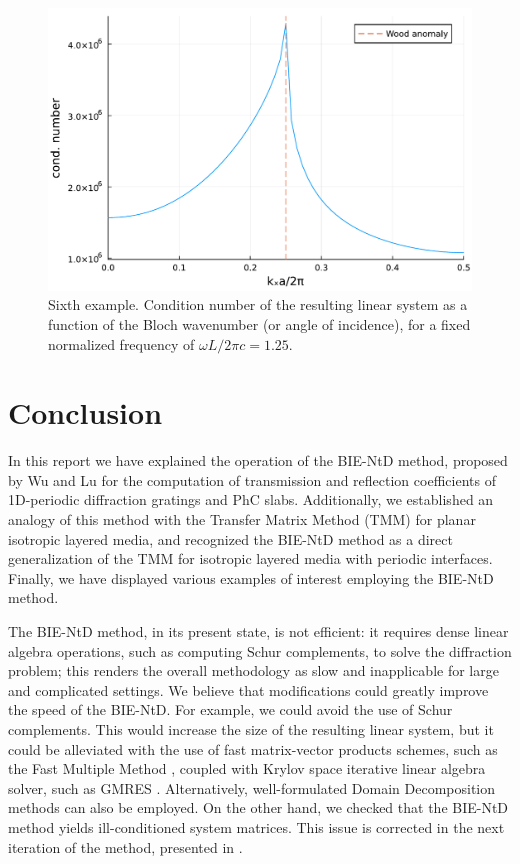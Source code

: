 \documentclass[reprint,amsmath,amssymb,
 aps]{revtex4-2}
\begin{document}
\begin{figure}[h!]
\includegraphics[width=0.6\columnwidth]{figures/ex5_cond_number.pdf}
\caption{Sixth example. Condition number of the resulting linear system as a function of the Bloch wavenumber (or angle of incidence), for a fixed normalized frequency of $\omega L / 2\pi c = 1.25$.}
\label{fig:ex5_cond_number}
\end{figure}


\section{Conclusion}
In this report we have explained the operation of the BIE-NtD method, proposed by Wu and Lu \cite{wu2009analyzing} for the computation of transmission and reflection coefficients of 1D-periodic diffraction gratings and PhC slabs. Additionally, we established an analogy of this method with the Transfer Matrix Method (TMM) for planar isotropic layered media, and recognized the BIE-NtD method as a direct generalization of the TMM for isotropic layered media with periodic interfaces. Finally, we have displayed various examples of interest employing the BIE-NtD method.

The BIE-NtD method, in its present state, is not efficient: it requires dense linear algebra operations, such as computing Schur complements, to solve the diffraction problem; this renders the overall methodology as slow and inapplicable for large and complicated settings. We believe that modifications could greatly improve the speed of the BIE-NtD. For example, we could avoid the use of Schur complements. This would increase the size of the resulting linear system, but it could be alleviated with the use of fast matrix-vector products schemes, such as the Fast Multiple Method \cite{greengard1987fast}, coupled with Krylov space iterative linear algebra solver, such as GMRES \cite{saad1986gmres}. Alternatively, well-formulated Domain Decomposition methods can also be employed. On the other hand, we checked that the BIE-NtD method yields ill-conditioned system matrices. This issue is corrected in the next iteration of the method, presented in \cite{lu2012high}.



\end{document}
